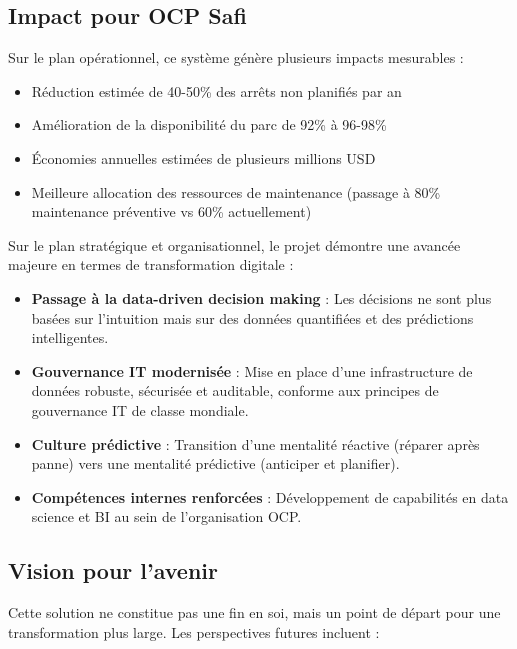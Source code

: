 \documentclass[a4paper,12pt,twoside]{report}
\begin{document}
\subsection{Impact pour OCP Safi}

Sur le plan opérationnel, ce système génère plusieurs impacts mesurables :
\begin{itemize}
    \item Réduction estimée de 40-50\% des arrêts non planifiés par an
    \item Amélioration de la disponibilité du parc de 92\% à 96-98\%
    \item Économies annuelles estimées de plusieurs millions USD
    \item Meilleure allocation des ressources de maintenance (passage à 80\% maintenance préventive vs 60\% actuellement)
\end{itemize}

Sur le plan stratégique et organisationnel, le projet démontre une avancée majeure en termes de transformation digitale :
\begin{itemize}
    \item \textbf{Passage à la data-driven decision making} : Les décisions ne sont plus basées sur l'intuition mais sur des données quantifiées et des prédictions intelligentes.
    
    \item \textbf{Gouvernance IT modernisée} : Mise en place d'une infrastructure de données robuste, sécurisée et auditable, conforme aux principes de gouvernance IT de classe mondiale.
    
    \item \textbf{Culture prédictive} : Transition d'une mentalité réactive (réparer après panne) vers une mentalité prédictive (anticiper et planifier).
    
    \item \textbf{Compétences internes renforcées} : Développement de capabilités en data science et BI au sein de l'organisation OCP.
\end{itemize}

\subsection{Vision pour l'avenir}

Cette solution ne constitue pas une fin en soi, mais un point de départ pour une transformation plus large. Les perspectives futures incluent :
\end{document}
